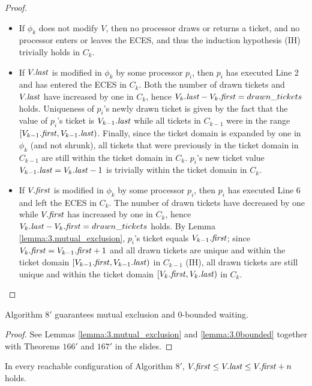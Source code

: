 \begin{proof}
\begin{itemize}
\item If $\phi_k$ does not modify $V$, then no processor draws or returns a ticket,
      and no processor enters or leaves the ECES, and thus the induction hypothesis (IH)
      trivially holds in $C_k$.
\item If $V.\mathit{last}$ is modified in $\phi_k$ by some processor $p_i$, then $p_i$ has executed
      Line 2 and has entered the ECES in $C_k$. Both the number of drawn tickets
      and $V.\mathit{last}$ have increased by one in $C_k$, hence $V_k.\mathit{last} - V_k.\mathit{first} = drawn\_tickets$
      holds. Uniqueness of $p_i$'s newly drawn ticket is given by the fact that
      the value of $p_i$'s ticket is $V_{k-1}.\mathit{last}$ while all tickets in $C_{k-1}$
      were in the range $[V_{k-1}.\mathit{first}, V_{k-1}.\mathit{last})$. Finally, since the ticket domain
      is expanded by one in $\phi_k$ (and not shrunk), all tickets that were previously
      in the ticket domain in $C_{k-1}$ are still within the ticket domain in $C_k$.
      $p_i$'s new ticket value $V_{k-1}.\mathit{last} = V_k.\mathit{last} - 1$ is trivially within
      the ticket domain in $C_k$.
\item If $V.\mathit{first}$ is modified in $\phi_k$ by some processor $p_i$, then $p_i$ has executed
      Line 6 and left the ECES in $C_k$. The number of drawn tickets
      have decreased by one while $V.\mathit{first}$ has increased by one in $C_k$, hence
      $V_k.\mathit{last} - V_k.\mathit{first} = drawn\_tickets$ holds.
      By Lemma \ref{lemma:3.mutual_exclusion}, $p_i$'s ticket equals $V_{k-1}.\mathit{first}$;
      since $V_k.\mathit{first} = V_{k-1}.\mathit{first} + 1$ and all drawn tickets are unique
      and within the ticket domain $[V_{k-1}.\mathit{first}, V_{k-1}.\mathit{last})$ in $C_{k-1}$ (IH),
      all drawn tickets are still unique and within the ticket domain $[V_k.\mathit{first}, V_k.\mathit{last})$
      in $C_k$.
\end{itemize}

\end{proof}

\begin{theorem}
Algorithm $8'$ guarantees mutual exclusion and 0-bounded waiting.
\end{theorem}

\begin{proof}
See Lemmas \ref{lemma:3.mutual_exclusion} and \ref{lemma:3.0bounded} together with
Theorems $166'$ and $167'$ in the slides.
\end{proof}


\begin{lemma} \label{lemma:3.Vbounds}
In every reachable configuration of Algorithm $8'$,
$V.\mathit{first} \leq V.\mathit{last} \leq V.\mathit{first}+n$ holds.
\end{lemma}

